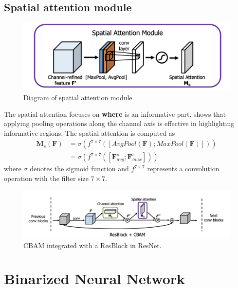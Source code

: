 \subsection{Spatial attention module}
\begin{figure}[h!]
	\centering
	\includegraphics[width=\linewidth]{img/spatial-attention-module}
	\caption{Diagram of spatial attention module.\cite{CBAM}}
	\label{fig:spatial-attention}
\end{figure}
The spatial attention focuses on \textbf{where} is an informative part. \cite{attention-transfer} shows that applying pooling operations along the channel axis is effective in highlighting informative regions.
The spatial attention is computed as
\begin{equation}
	\begin{split}
		\textbf{M}_s(\textbf{F}) &= \sigma(f^{7\times7} ([AvgPool(\textbf{F}); MaxPool(\textbf{F})]))\\
		&= \sigma(f^{7\times 7}([\textbf{F}^s_{avg}; \textbf{F}^s_{max}]))
	\end{split}
\end{equation}
where $ \sigma $ denotes the sigmoid function and $ f^{7\times 7} $ represents a convolution operation with the filter size $ 7\times 7. $


\begin{figure}[h!]
	\centering
	\includegraphics[width=\linewidth]{img/cbam-with-resblock}
	\caption{CBAM integrated with a ResBlock in ResNet.\cite{CBAM}}
	\label{fig:cbam-with-resblock}
\end{figure}



\section{Binarized Neural Network}

